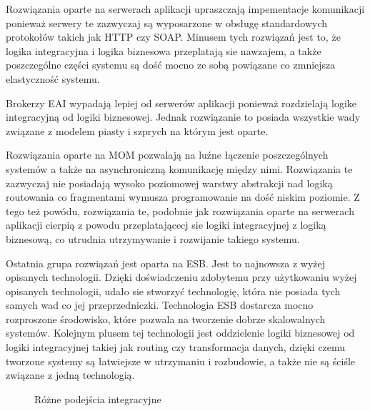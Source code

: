 Rozwiązania oparte na serwerach aplikacji upraszczają impementacje komunikacji ponieważ serwery te zazwyczaj są wyposarzone w obsługę standardowych protokołów takich jak HTTP czy SOAP. Minusem tych rozwiązań jest to, że logika integracyjna i logika biznesowa przeplatają sie nawzajem, a także poszczególne części systemu są dość mocno ze sobą powiązane co zmniejsza elastyczność systemu.

 Brokerzy EAI wypadają lepiej od serwerów aplikacji ponieważ rozdzielają logike integracyjną od logiki biznesowej. Jednak rozwiązanie to posiada wszystkie wady związane z modelem piasty i szprych na którym jest oparte.

Rozwiązania oparte na MOM pozwalają na luźne łączenie poszczególnych systemów a także na asynchroniczną komunikację między nimi. Rozwiązania te zazwyczaj nie posiadają wysoko poziomowej warstwy abstrakcji nad logiką routowania co fragmentami wymusza programowanie na dość niskim poziomie. Z tego też powódu, rozwiązania te, podobnie jak rozwiązania oparte na serwerach aplikacji cierpią z powodu przeplatającecj sie logiki integracyjnej z logiką biznesową, co utrudnia utrzymywanie i rozwijanie takiego systemu.

Ostatnia grupa rozwiązań jest oparta na ESB. Jest to najnowsza z wyżej opisanych technologii. Dzięki doświadczeniu zdobytemu przy użytkowaniu wyżej opisanych technologii, udało sie stworzyć technologię, która nie posiada tych samych wad co jej przeprzedniczki. Technologia ESB dostarcza mocno rozproszone środowisko, które pozwala na tworzenie dobrze skalowalnych systemów. Kolejnym plusem tej technologii jest oddzielenie logiki biznesowej od logiki integracyjnej takiej jak routing czy transformacja danych, dzięki czemu tworzone systemy są łatwiejsze w utrzymaniu i rozbudowie, a także nie są ściśle związane z jedną technologią. 

\setlength\fboxsep{20pt}
\setlength\fboxrule{1pt}
\begin{figure}[!h]
	\centering
	\caption{Różne podejścia integracyjne  \cite{chappell2004}}\label{fig:podejscia_integracyjne}
\end{figure}


